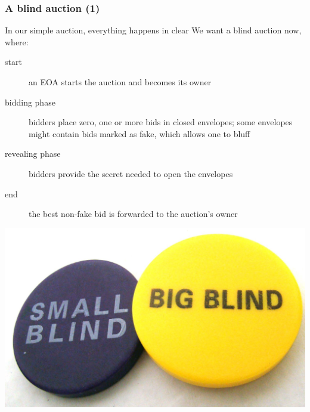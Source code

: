 \documentclass[11pt]{beamer}  %
\begin{document}
\begin{frame}\frametitle{A blind auction (1)}

  \begin{greenbox}{In our simple auction, everything happens in clear}
    We want a \alert{blind auction} now, where:
    \begin{description}
    \item[start] an EOA starts the auction and becomes its owner
    \item[bidding phase] bidders place zero, one or more bids in \alert{closed envelopes};
      some envelopes might contain bids marked as \alert{fake}, which allows one to bluff
    \item[revealing phase] bidders provide the secret needed to open the envelopes
    \item[end] the best non-fake bid is forwarded to the auction's owner
    \end{description}
  \end{greenbox}

  \begin{center}
    \includegraphics[scale=0.1,clip=false]{pictures/blind.jpg}
  \end{center}

\end{frame}
\end{document}
